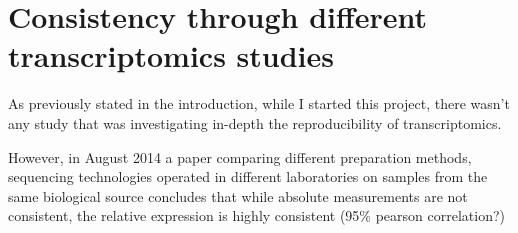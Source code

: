 \clearpage
\chapter{Consistency through different transcriptomics studies}
\label{sec:Transcriptomics}

As previously stated in the introduction, while I started this project, 
there wasn't any study that was investigating in-depth the reproducibility of transcriptomics.

\begin{comment} 
Should the following go to the intro?
\end{comment}

However, in August 2014 a paper comparing different preparation methods, 
sequencing technologies operated in different laboratories
on samples from the same biological source concludes that while absolute measurements are not 
consistent, the relative expression is highly consistent (95\% pearson correlation?)



